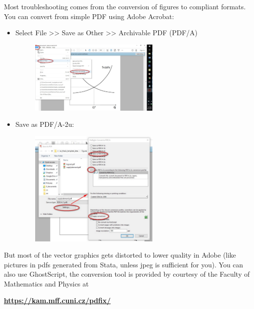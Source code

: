 Most troubleshooting comes from the conversion of figures to compliant formats. You can convert from simple PDF using Adobe Acrobat:
\begin{itemize}
	\item Select File >> Save as Other >> Archivable PDF (PDF/A)
				\begin{figure}[!h]
					\centering
						\includegraphics[width=0.6\textwidth]{Figures/conversion1.pdf}
					\label{fig:conversion1}
				\end{figure}
	\item Save as PDF/A-2u:
			\begin{figure}[!h]
				\centering
					\includegraphics[width=0.6\textwidth]{Figures/conversion2.pdf}
				\label{fig:conversion2}
			\end{figure}
\end{itemize}	


But most of the vector graphics gets distorted to lower quality in Adobe (like pictures in pdfs generated from Stata, unless jpeg is sufficient for you).
You can also use GhostScript, the conversion tool is provided by courtesy of the Faculty of Mathematics and Physics at

\vspace{0.5cm}
\textbf{\href{https://kam.mff.cuni.cz/pdfix/}{https://kam.mff.cuni.cz/pdfix/}}
\vspace{0.5cm}


